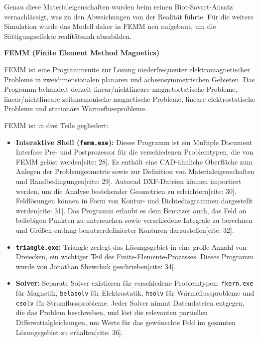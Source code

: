 Genau diese Materialeigenschaften wurden beim reinen Biot-Savart-Ansatz vernachlässigt, was zu den Abweichungen von der Realität führte. Für die weitere Simulation wurde das Modell daher in FEMM neu aufgebaut, um die Sättigungseffekte realitätsnah abzubilden.


\textbf{FEMM (Finite Element Method Magnetics)}

FEMM ist eine Programmsuite zur Lösung niederfrequenter elektromagnetischer Probleme in zweidimensionalen planaren und achsensymmetrischen Gebieten. Das Programm behandelt derzeit linear/nichtlineare magnetostatische Probleme, linear/nichtlineare zeitharmonische magnetische Probleme, lineare elektrostatische Probleme und stationäre Wärmeflussprobleme.

FEMM ist in drei Teile gegliedert:

\begin{itemize}
    \item \textbf{Interaktive Shell (\texttt{femm.exe}):} Dieses Programm ist ein Multiple Document Interface Pre- und Postprozessor für die verschiedenen Problemtypen, die von FEMM gelöst werden[cite: 28]. Es enthält eine CAD-ähnliche Oberfläche zum Anlegen der Problemgeometrie sowie zur Definition von Materialeigenschaften und Randbedingungen[cite: 29]. Autocad DXF-Dateien können importiert werden, um die Analyse bestehender Geometrien zu erleichtern[cite: 30]. Feldlösungen können in Form von Kontur- und Dichtediagrammen dargestellt werden[cite: 31]. Das Programm erlaubt es dem Benutzer auch, das Feld an beliebigen Punkten zu untersuchen sowie verschiedene Integrale zu berechnen und Grö\ss en entlang benutzerdefinierter Konturen darzustellen[cite: 32].

    \item \textbf{\texttt{triangle.exe}:} Triangle zerlegt das Lösungsgebiet in eine gro\ss e Anzahl von Dreiecken, ein wichtiger Teil des Finite-Elemente-Prozesses. Dieses Programm wurde von Jonathan Shewchuk geschrieben[cite: 34].

    \item \textbf{Solver:} Separate Solver existieren für verschiedene Problemtypen: \texttt{fkern.exe} für Magnetik, \texttt{belasolv} für Elektrostatik, \texttt{hsolv} für Wärmeflussprobleme und \texttt{csolv} für Stromflussprobleme. Jeder Solver nimmt Datendateien entgegen, die das Problem beschreiben, und löst die relevanten partiellen Differentialgleichungen, um Werte für das gewünschte Feld im gesamten Lösungsgebiet zu erhalten[cite: 36].
\end{itemize}


